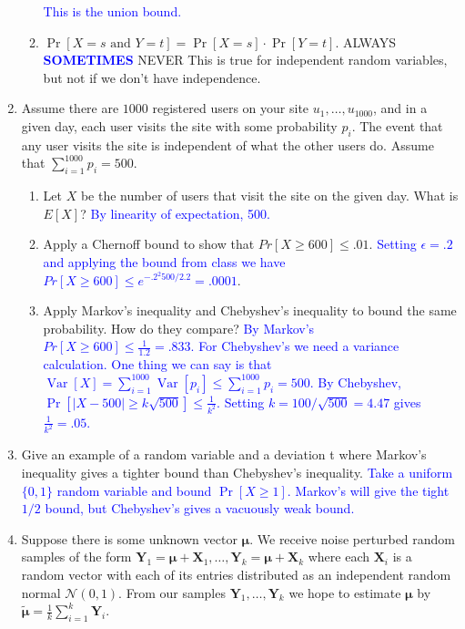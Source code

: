 \documentclass[10pt]{article}
\newcommand{\bs}[1]{\boldsymbol{#1}}
\newcommand{\bv}[1]{\mathbf{#1}}
\DeclareMathOperator*{\Var}{Var}
\begin{document}
\begin{enumerate}
\begin{enumerate}[label=(\alph*)]
		\textcolor{blue}{This is the union bound.}
		\item $\Pr[{X} = s \text{ and } {Y} = t] = \Pr[{X} = s] \cdot \Pr[{Y} = t]$. \hspace{1em}ALWAYS\hspace{1em} \textcolor{blue}{\textbf{SOMETIMES}}\hspace{1em} NEVER
		This is true for independent random variables, but not if we don't have independence.
		
	\end{enumerate}
	\item Assume there are $1000$ registered users on your site $u_1, \ldots, u_{1000}$, and in a given day, each user
	visits the site with some probability $p_i$. The event that any user visits the site is independent of what the other users do. Assume that $\sum_{i=1}^{1000} p_i = 500$. 
	\begin{enumerate}
		\item  Let $X$ be the number of users that visit the site on the given day. What is $E[X]$?
		\textcolor{blue}{{By linearity of expectation, 500}.}
		\item Apply a Chernoff bound to show that $Pr[X \geq 600] \leq .01$. \textcolor{blue}{Setting $\epsilon = .2$ and applying the bound from class we have $Pr[X \geq 600] \leq e^{-.2^2 500/2.2} = .0001$}.
		\item Apply Markov’s inequality and Chebyshev’s inequality to bound the same probability.
		How do they compare?
		\textcolor{blue}{By Markov's $Pr[X \geq 600] \leq \frac{1}{1.2} = .833$. For Chebyshev's we need a variance calculation. One thing we can say is that $\Var[X] = \sum_{i=1}^{1000} \Var[p_i] \leq \sum_{i=1}^{1000}p_i = 500$. By Chebyshev, $\Pr[|X-500| \geq k\sqrt{500}] \leq \frac{1}{k^2}$. Setting $k = 100/\sqrt{500} = 4.47$ gives $\frac{1}{k^2} = .05$.}
	\end{enumerate}
	\item Give an example of a random variable and a deviation t where Markov’s inequality gives a	tighter bound than Chebyshev’s inequality.
	\textcolor{blue}{Take a uniform $\{0,1\}$ random variable and bound $\Pr[X \geq 1]$. Markov's will give the tight $1/2$ bound, but Chebyshev's gives a vacuously weak bound.}
	\item Suppose there is some unknown vector $\bs{\mu}$. We receive noise perturbed random samples of the form $\bv{Y}_1 = \bs{\mu} + \bv{X}_1, \ldots, \bv{Y}_k = \bs{\mu} + \bv{X}_k$ where each $\bv{X}_i$ is a random vector with each of its entries distributed as an independent random normal $\mathcal{N}(0,1)$. From our samples $\bv{Y}_1, \ldots, \bv{Y}_k$ we hope to estimate $\bs{\mu}$ by $\bs{\tilde{\mu}} = \frac{1}{k}\sum_{i=1}^k \bv{Y}_i$. 

\end{enumerate}
\end{document}
